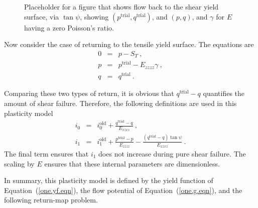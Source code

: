 \documentclass[]{scrreprt}
\begin{document}
\begin{figure}[htb]
\begin{center}
\caption{Placeholder for a figure that shows flow back to the shear
  yield surface, via $\tan\psi$, showing $(p^{\mathrm{trial}},
  q^{\mathrm{trial}})$, and $(p, q)$, and $\gamma$ for $E$ having a
  zero Poisson's ratio.}
\label{shear.return.fig}
\end{center}
\end{figure}

Now consider the case of returning to the tensile yield surface.  The
equations are
\begin{eqnarray}
0 & = & p - S_{T} \ , \\
p & = & p^{\mathrm{trial}} - E_{zzzz}\gamma \ , \\
q & = & q^{\mathrm{trial}} \ .
\end{eqnarray}

Comparing these two types of return, it is obvious that
$q^{\mathrm{trial}} - q$ quantifies the amount of shear failure.
Therefore, the following definitions are used in this plasticity model
\begin{eqnarray}
i_{0} & = & i_{0}^{\mathrm{old}} + \frac{q^{\mathrm{trial}} -
  q}{E_{xzxz}} \ , \\
i_{1} & = & i_{1}^{\mathrm{old}} + \frac{p^{\mathrm{trial}} -
  p}{E_{zzzz}} - \frac{(q^{\mathrm{trial}} - q)\tan\psi}{E_{xzxz}} \ .
\end{eqnarray}
The final term ensures that $i_{1}$ does not increase during pure
shear failure.  The scaling by $E$ ensures that these internal
parameters are dimensionless.

In summary, this plasticity model is defined by the yield function of
Equation~(\ref{one.yf.eqn}), the flow potential of
Equation~(\ref{one.g.eqn}), and the following return-map problem.
\end{document}
